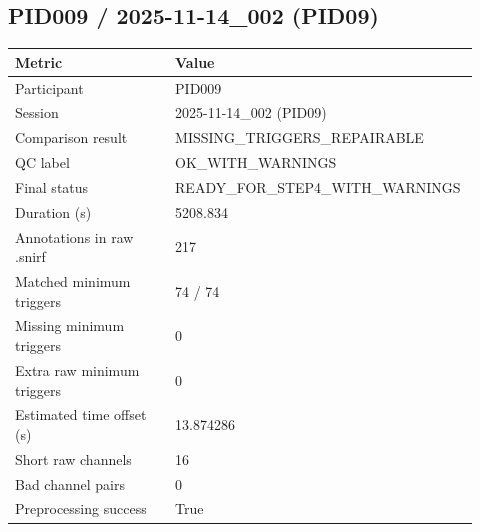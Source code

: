 \subsection*{PID009 / 2025-11-14\_002 (PID09)}
\begin{tabular}{p{0.34\linewidth}p{0.58\linewidth}}
\toprule
Metric & Value\\
\midrule
Participant & PID009\\
Session & 2025-11-14\_002 (PID09)\\
Comparison result & MISSING\_TRIGGERS\_REPAIRABLE\\
QC label & OK\_WITH\_WARNINGS\\
Final status & READY\_FOR\_STEP4\_WITH\_WARNINGS\\
Duration (s) & 5208.834\\
Annotations in raw .snirf & 217\\
Matched minimum triggers & 74 / 74\\
Missing minimum triggers & 0\\
Extra raw minimum triggers & 0\\
Estimated time offset (s) & 13.874286\\
Short raw channels & 16\\
Bad channel pairs & 0\\
Preprocessing success & True\\
\bottomrule
\end{tabular}
